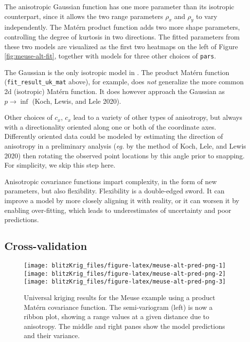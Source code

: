The anisotropic Gaussian function has one more parameter than its isotropic counterpart, since it allows the two range parameters \(\rho_x\) and \(\rho_y\) to vary independently. The Matérn product function adds two more shape parameters, controlling the degree of kurtosis in two directions. The fitted parameters from these two models are visualized as the first two heatmaps on the left of Figure \ref{fig:meuse-alt-fit}, together with models for three other choices of \texttt{pars}.

The Gaussian is the only isotropic model in . The product Matérn function (\texttt{fit\_result\_uk\_mat} above), for example, does \emph{not} generalize the more common 2d (isotropic) Matérn function. It does however approach the Gaussian as \(p \to \inf\) (Koch, Lewis, and Lele 2020).

Other choices of \(c_x\), \(c_x\) lead to a variety of other types of anisotropy, but always with a directionality oriented along one or both of the coordinate axes. Differently oriented data could be modeled by estimating the direction of anisotropy in a preliminary analysis (\emph{eg.} by the method of Koch, Lele, and Lewis 2020) then rotating the observed point locations by this angle prior to snapping. For simplicity, we skip this step here.

Anisotropic covariance functions impart complexity, in the form of new parameters, but also flexibility. Flexibility is a double-edged sword. It can improve a model by more closely aligning it with reality, or it can worsen it by enabling over-fitting, which leads to underestimates of uncertainty and poor predictions.

\hypertarget{cross-validation}{%
\subsection{Cross-validation}\label{cross-validation}}

\begin{figure}[!bht]
\texttt{[image: blitzKrig\_files/figure-latex/meuse-alt-pred-png-1]} \texttt{[image: blitzKrig\_files/figure-latex/meuse-alt-pred-png-2]} \texttt{[image: blitzKrig\_files/figure-latex/meuse-alt-pred-png-3]} \caption{Universal kriging results for the Meuse example using a product Matérn covariance function. The semi-variogram (left) is now a ribbon plot, showing a range values at a given distance due to anisotropy. The middle and right panes show the model predictions and their variance.}\label{fig:meuse-alt-pred-png}
\end{figure}


